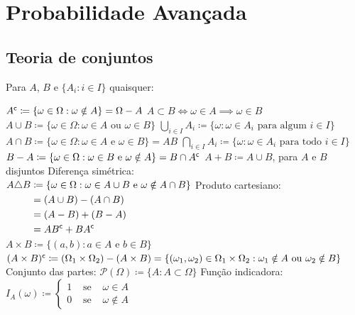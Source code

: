 \chapter{Probabilidade Avançada}

\section{Teoria de conjuntos}

\begin{definition} Para $A$, $B$ e $\{A_i: i \in I\}$ quaisquer:
	\begin{outline}
		\1 \( A^\mathsf{c} \coloneq \{ \omega\in\Omega : \omega \notin A\} = \Omega-A\)
		\1 \( A \subset B \iff \omega \in A \implies \omega \in B \)
		\1 \( A\cup B \coloneq \{ \omega\in\Omega : \omega \in A \text{ ou } \omega \in B\}\)
		\1 \( \bigcup_{i\in I}A_i \coloneq \{ \omega : \omega \in A_i \text{ para algum } i \in I \}\)
		\1 \( A\cap B \coloneq \{ \omega\in\Omega : \omega \in A \text{ e } \omega \in B\} = AB\)
		\1 \( \bigcap_{i\in I}A_i \coloneq \{ \omega : \omega \in A_i \text{ para todo } i \in I \}\)
		\1 \(B - A \coloneq \{ \omega\in\Omega : \omega \in B \text{ e } \omega \notin A\} = B\cap A^\mathsf{c} \)
		\1 \(A+B \coloneq A\cup B\), para $A$ e $B$ disjuntos
		\1 Diferença simétrica: \\ \(\begin{aligned}[t]
				A \triangle B &\coloneq \{ \omega\in\Omega : \omega \in A\cup B \text{ e } \omega 	\notin A\cap B\} \\
				&= (A\cup B) - (A\cap B) \\
				&= (A-B) + (B-A) \\
				&= AB^\mathsf{c}+BA^\mathsf{c}
			\end{aligned}\)
		\1 Produto cartesiano: \( A \times B \coloneq  \{ (a,b): a \in A \text{ e } b \in B\}\)
		\1 \( (A \times B)^\mathsf{c} \coloneq (\Omega_1\times\Omega_2)-(A\times B) = \{ (\omega_1,\omega_2) \in \Omega_1\times\Omega_2: \omega_1 \notin A \text{ ou } \omega_2 \notin B\}\)
		\1 Conjunto das partes: \( \mathcal{P}(\Omega) \coloneq \{A: A\subset \Omega\} \)
		\1 Função indicadora: \\
		\( I_A(\omega) \coloneq \left\{ \begin{array}{lcl} 
			1 & \text{ se } & \omega \in A \\ 
			0 & \text{ se } & \omega \notin A 
		\end{array} \right. \)
	\end{outline}	
\end{definition}

